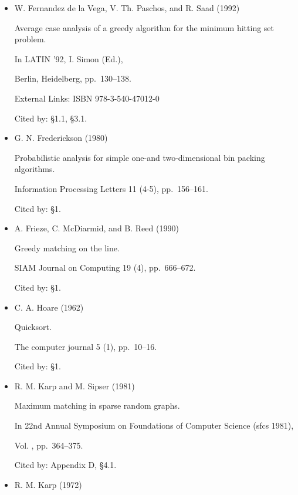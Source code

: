 \documentclass[10pt,a4paper]{article}
\begin{document}
\begin{itemize}
J. ACM 45 (4), pp. 634–652.

External Links: ISSN 0004-5411

Cited by: §1.



\item[] [12]
W. Fernandez de la Vega, V. Th. Paschos, and R. Saad (1992)

Average case analysis of a greedy algorithm for the minimum hitting set problem.

In LATIN ’92,  I. Simon (Ed.),

Berlin, Heidelberg, pp. 130–138.

External Links: ISBN 978-3-540-47012-0

Cited by: §1.1,
§3.1.



\item[] [13]
G. N. Frederickson (1980)

Probabilistic analysis for simple one-and two-dimensional bin packing algorithms.

Information Processing Letters 11 (4-5), pp. 156–161.

Cited by: §1.



\item[] [14]
A. Frieze, C. McDiarmid, and B. Reed (1990)

Greedy matching on the line.

SIAM Journal on Computing 19 (4), pp. 666–672.

Cited by: §1.



\item[] [15]
C. A. Hoare (1962)

Quicksort.

The computer journal 5 (1), pp. 10–16.

Cited by: §1.



\item[] [16]
R. M. Karp and M. Sipser (1981)

Maximum matching in sparse random graphs.

In 22nd Annual Symposium on Foundations of Computer Science (sfcs 1981),

Vol. , pp. 364–375.

Cited by: Appendix D,
§4.1.



\item[] [17]
R. M. Karp (1972)


\end{itemize}
\end{document}
